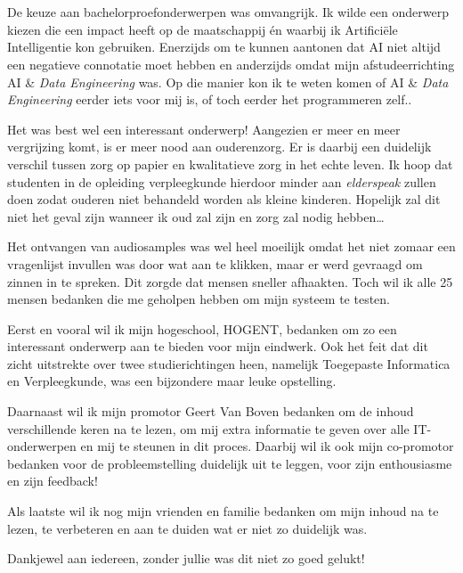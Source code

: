 
\chapter*{}
\label{ch:voorwoord}


De keuze aan bachelorproefonderwerpen was omvangrijk. Ik wilde een onderwerp kiezen die een impact heeft op de maatschappij én waarbij ik Artificiële Intelligentie kon gebruiken. Enerzijds om te kunnen aantonen dat AI niet altijd een negatieve connotatie moet hebben en anderzijds omdat mijn afstudeerrichting AI \& \textit{Data Engineering} was. Op die manier kon ik te weten komen of AI \& \textit{Data Engineering} eerder iets voor mij is, of toch eerder het programmeren zelf..

Het was best wel een interessant onderwerp! Aangezien er meer en meer vergrijzing komt, is er meer nood aan ouderenzorg. Er is daarbij een duidelijk verschil tussen zorg op papier en kwalitatieve zorg in het echte leven. Ik hoop dat studenten in de opleiding verpleegkunde hierdoor minder aan \textit{elderspeak} zullen doen zodat ouderen niet behandeld worden als kleine kinderen. Hopelijk zal dit niet het geval zijn wanneer ik oud zal zijn en zorg zal nodig hebben\ldots


Het ontvangen van audiosamples was wel heel moeilijk omdat het niet zomaar een vragenlijst invullen was door wat aan te klikken, maar er werd gevraagd om zinnen in te spreken. Dit zorgde dat mensen sneller afhaakten. Toch wil ik alle 25 %
mensen bedanken die me geholpen hebben om mijn systeem te testen.

Eerst en vooral wil ik mijn hogeschool, HOGENT, bedanken om zo een interessant onderwerp aan te bieden voor mijn eindwerk. Ook het feit dat dit zicht uitstrekte over twee studierichtingen heen, namelijk Toegepaste Informatica en Verpleegkunde, was een bijzondere maar leuke opstelling.

Daarnaast wil ik mijn promotor Geert Van Boven bedanken om de inhoud verschillende keren na te lezen, om mij extra informatie te geven over alle IT-onderwerpen en mij te steunen in dit proces.
Daarbij wil ik ook mijn co-promotor bedanken voor de probleemstelling duidelijk uit te leggen, voor zijn enthousiasme en zijn feedback!

Als laatste wil ik nog mijn vrienden en familie bedanken om mijn inhoud na te lezen, te verbeteren en aan te duiden wat er niet zo duidelijk was.

Dankjewel aan iedereen, zonder jullie was dit niet zo goed gelukt!